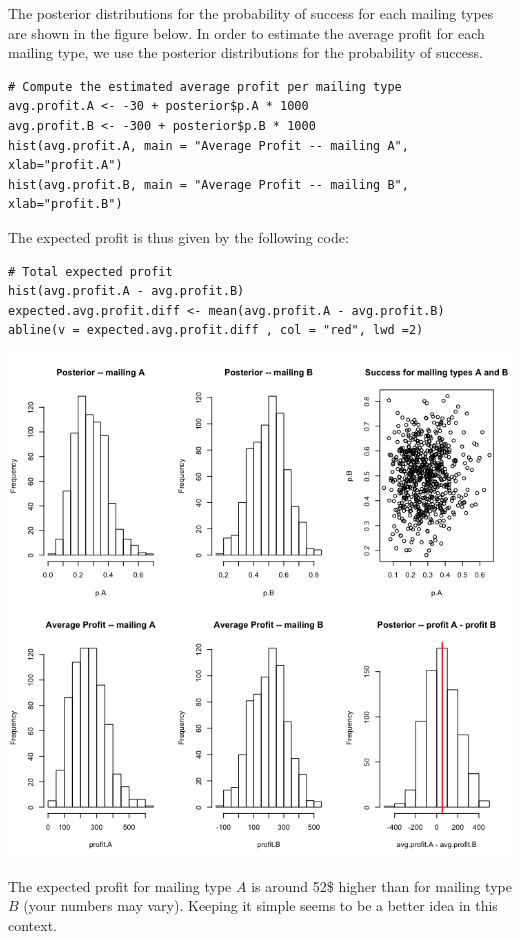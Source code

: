 \begin{Example}
\newpage\noindent
The posterior distributions for the probability of success for each mailing types are shown in the figure below. 
\newl In order to estimate the average profit for each mailing type, we use the posterior distributions for the probability of success.   
\begin{lstlisting}
# Compute the estimated average profit per mailing type
avg.profit.A <- -30 + posterior$p.A * 1000 
avg.profit.B <- -300 + posterior$p.B * 1000 
hist(avg.profit.A, main = "Average Profit -- mailing A", xlab="profit.A") 
hist(avg.profit.B, main = "Average Profit -- mailing B", xlab="profit.B")
\end{lstlisting}
\noindent The expected profit is thus given by the following code:
\begin{lstlisting}
# Total expected profit
hist(avg.profit.A - avg.profit.B)
expected.avg.profit.diff <- mean(avg.profit.A - avg.profit.B)
abline(v = expected.avg.profit.diff , col = "red", lwd =2)
\end{lstlisting}
\begin{center}
  \includegraphics[width=\linewidth]{Images/example12e.png}
\end{center}
The expected profit for mailing type $A$ is around 52\$ higher than for mailing type $B$ (your numbers may vary). Keeping it simple seems to be a better idea in this context. 
\end{Example}


